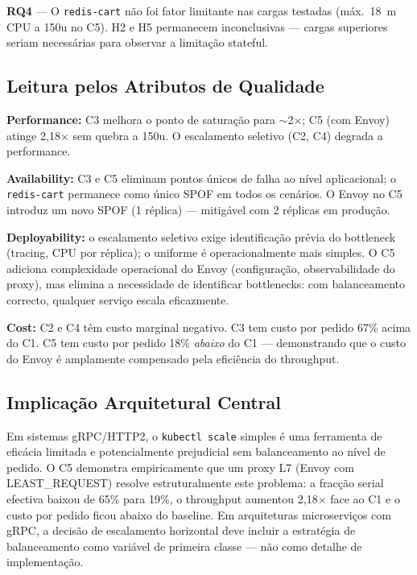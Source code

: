 \documentclass[acmsmall,screen=true,nonacm]{acmart}
\begin{document}
\textbf{RQ4} — O \texttt{redis-cart} não foi fator limitante nas cargas testadas (máx.\ 18~m CPU a 150u no C5). H2 e H5 permanecem inconclusivas — cargas superiores seriam necessárias para observar a limitação stateful.

\subsection{Leitura pelos Atributos de Qualidade}

\textbf{Performance:} C3 melhora o ponto de saturação para $\sim$2$\times$; C5 (com Envoy) atinge 2,18$\times$ sem quebra a 150u. O escalamento seletivo (C2, C4) degrada a performance.

\textbf{Availability:} C3 e C5 eliminam pontos únicos de falha ao nível aplicacional; o \texttt{redis-cart} permanece como único SPOF em todos os cenários. O Envoy no C5 introduz um novo SPOF (1 réplica) — mitigável com 2 réplicas em produção.

\textbf{Deployability:} o escalamento seletivo exige identificação prévia do bottleneck (tracing, CPU por réplica); o uniforme é operacionalmente mais simples. O C5 adiciona complexidade operacional do Envoy (configuração, observabilidade do proxy), mas elimina a necessidade de identificar bottlenecks: com balanceamento correcto, qualquer serviço escala eficazmente.

\textbf{Cost:} C2 e C4 têm custo marginal negativo. C3 tem custo por pedido 67\% acima do C1. C5 tem custo por pedido 18\% \emph{abaixo} do C1 — demonstrando que o custo do Envoy é amplamente compensado pela eficiência do throughput.

\subsection{Implicação Arquitetural Central}

Em sistemas gRPC/HTTP2, o \texttt{kubectl scale} simples é uma ferramenta de eficácia limitada e potencialmente prejudicial sem balanceamento ao nível de pedido. O C5 demonstra empiricamente que um proxy L7 (Envoy com LEAST\_REQUEST) resolve estruturalmente este problema: a fracção serial efectiva baixou de 65\% para 19\%, o throughput aumentou 2,18$\times$ face ao C1 e o custo por pedido ficou abaixo do baseline. Em arquiteturas microserviços com gRPC, a decisão de escalamento horizontal deve incluir a estratégia de balanceamento como variável de primeira classe — não como detalhe de implementação.
\end{document}
